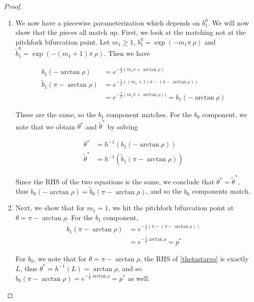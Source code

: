 \documentclass[thesis.tex]{subfiles}
\begin{document}
\begin{lemma}
\begin{proof}
\begin{enumerate}
\begin{enumerate}
		\item We now have a piecewise parameterization which depends on $b_1^0$. We will now show that the pieces all match up. First, we look at the matching not at the pitchfork bifurcation point. Let $m_1 \geq 1$, $b_1^0 = \exp(-m_1 \pi \ \rho )$ and $\tilde{b}_1^0 = \exp(-(m_1+1) \pi \ \rho )$. Then we have

		\begin{align*}
		b_1(-\arctan \rho) &= e^{ -\frac{1}{\rho}(m_1 \pi + \arctan \rho) } \\
		\tilde{b}_1(\pi - \arctan \rho) 
		&= e^{ -\frac{1}{\rho}((m_1+1) \pi - (\pi - \arctan \rho)) } \\
		&= e^{ -\frac{1}{\rho}(m_1 \pi + \arctan \rho)) } = b_1(-\arctan \rho)
		\end{align*}

		These are the same, so the $b_1$ component matches. For the $b_0$ component, we note that we obtain $\theta^*$ and $\tilde{\theta}^*$ by solving

		\begin{align*}
		\theta^* &= h^{-1} (b_1(-\arctan \rho)) \\
		\tilde{\theta}^* &= h^{-1} (\tilde{b}_1(\pi - \arctan \rho)) 
		\end{align*}

		Since the RHS of the two equations is the same, we conclude that $\theta^* = \tilde{\theta}^*$, thus $b_0(-\arctan \rho) = \tilde{b}_0(\pi - \arctan \rho)$, and so the $b_0$ components match.

		\item Next, we show that for $m_1 = 1$, we hit the pitchfork bifurcation point at $\theta = \pi - \arctan \rho$. For the $b_1$ component, 
		\begin{align*}
		b_1(\pi -\arctan \rho) &= e^{ -\frac{1}{\rho}(\pi - (\pi - \arctan \rho)) } \\
		&= e^{ -\frac{1}{\rho} \arctan \rho } = p^*
		\end{align*}

		For $b_0$, we note that for $\theta = \pi -\arctan \rho$, the RHS of \eqref{thetastareq} is exactly $L$, thus $\theta^* = h^{-1}(L) = \arctan \rho$, and so $b_0(\pi -\arctan \rho) = e^{ -\frac{1}{\rho} \arctan \rho } = p^*$ as well.


\end{enumerate}
\end{enumerate}
\end{proof}
\end{lemma}
\end{document}
